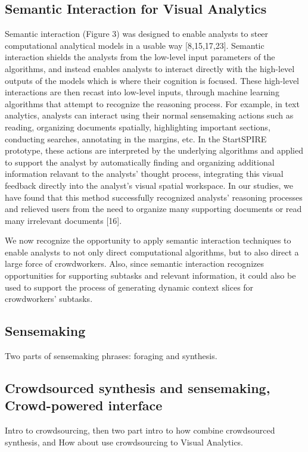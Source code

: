 \documentclass[journal]{vgtc}                %
\begin{document}
\subsection{Semantic Interaction for Visual Analytics}
Semantic interaction (Figure 3) was designed to enable analysts to steer computational analytical models in a usable way [8,15,17,23].
Semantic interaction shields the analysts from the low-level input parameters of the algorithms, and instead enables analysts to interact directly with the high-level outputs of the models which is where their cognition is focused.
These high-level interactions are then recast into low-level inputs, through machine learning algorithms that attempt to recognize the reasoning process.
For example, in text analytics, analysts can interact using their normal sensemaking actions such as reading, organizing documents spatially, highlighting important sections, conducting searches, annotating in the margins, etc. In the StartSPIRE prototype, these actions are interpreted by the underlying algorithms and applied to support the analyst by automatically finding and organizing additional information relavant to the analysts' thought process, integrating this visual feedback directly into the analyst's visual spatial workspace.
In our studies, we have found that this method successfully recognized analysts’ reasoning processes and relieved users from the need to organize many supporting documents or read many irrelevant documents [16].

We now recognize the opportunity to apply semantic interaction techniques to enable analysts to not only direct computational algorithms, but to also direct a large force of crowdworkers.
Also, since semantic interaction recognizes opportunities for supporting subtasks and relevant information, it could also be used to support the process of generating dynamic context slices for crowdworkers’ subtasks.

\subsection{Sensemaking}
Two parts of sensemaking phrases: foraging and synthesis.

\subsection{Crowdsourced synthesis and sensemaking, Crowd-powered interface}
Intro to crowdsourcing, then two part intro to how combine crowdsourced synthesis, and How about use crowdsourcing to Visual Analytics.
\end{document}
